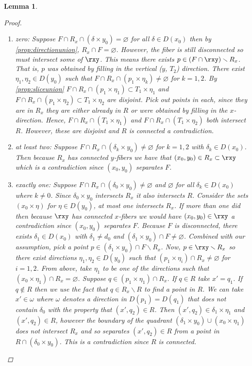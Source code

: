 \documentclass[12pt,parskip=full]{report}
\theoremstyle{plain}
\newtheorem{lem}[thm]{Lemma}
\theoremstyle{definition}
\begin{document}
\begin{lem}
\begin{proof}
        \begin{enumerate}
            \item zero: Suppose \(F\cap R_x \cap (\delta \times y_0)=\varnothing\) for all \(\delta\in D(x_0)\) then by \ref{prop:directionunion}, $R_x \cap F=\varnothing$. However, the fiber is still disconnected so must intersect some of $\rxy$. This means there exists $p\in (F\cap \rxy)\smallsetminus R_x$. That is, $p$ was obtained by filling in the vertical ($y$, $T_2$) direction. There exist $\eta_1, \eta_2\in D(y_0)$ such that $F\cap R_x \cap (p_1 \times \eta_k) \neq \varnothing$ for $k=1,2$. By \ref{prop:sliceunion} \(F\cap R_x \cap (p_1 \times \eta_1)\subset T_1\times \eta_1\) and \(F \cap R_x \cap (p_1 \times \eta_2)\subset T_1\times \eta_2\) are disjoint. Pick out points in each, since they are in $R_x$ they are either already in $R$ or were obtained by filling in the $x$-direction. Hence, $F\cap R_x \cap (T_1\times \eta_1)$ and $F\cap R_x \cap (T_1\times \eta_2)$ both intersect $R$. However, these are disjoint and $R$ is connected a contradiction.
            \item at least two: Suppose \(F\cap R_x\cap(\delta_k \times y_0)\neq\varnothing\) for $k=1,2$ with $\delta_k\in D(x_0)$. Then because $R_x$ has connected $y$-fibers we have that $(x_0,y_0)\in R_x\subset \rxy$ which is a contradiction since $(x_0,y_0)$ separates $F$.
            \item exactly one: Suppose \(F\cap R_x\cap(\delta_0 \times y_0)\neq\varnothing\) and $\varnothing$ for all $\delta_k\in D(x_0)$ where $k\neq 0$. Since $\delta_0\times y_0$ intersects $R_x$ it also intersects $R$. Consider the sets $(x_0\times \eta)$ for $\eta\in D(y_0)$, at most one intersects $R_x$. If more than one did then because $\rxy$ has connected $x$-fibers we would have $(x_0,y_0)\in\rxy$ a contradiction since $(x_0,y_0)$ separates $F$. Because $F$ is disconnected, there exists $\delta_1\in D(x_0)$ with $\delta_1\neq d_0$ and $(\delta_1\times y_0)\cap F\neq \varnothing$. Combined with our assumption, pick a point $p\in (\delta_1\times y_0)\cap F\smallsetminus R_x$. Now, $p\in\rxy\smallsetminus R_x$ so there exist directions $\eta_1,\eta_2\in D(y_0)$ such that $(p_1\times \eta_i)\cap R_x\neq\varnothing$ for $i=1,2$. From above, take $\eta_1$ to be one of the directions such that $(x_0\times \eta_1)\cap R_x =\varnothing$. Suppose $q\in (p_1\times \eta_1)\cap R_x$. If $q\in R$ take $x'=q_1$. If $q\not\in R$ then we use the fact that $q\in R_x\smallsetminus R$ to find a point in $R$. We can take $x'\in \omega$ where $\omega$ denotes a direction in $D(p_1)=D(q_1)$ that does not contain $\delta_0$ with the property that $(x',q_2)\in R$. Then $(x', q_2)\in \delta_1\times \eta_1$ and $(x',q_2)\in R$, however the boundary of the quadrant $(\delta_1\times y_0)\cup (x_0\times \eta_1)$ does not intersect $R_x$ and so separates $(x',q_2)\in R$ from a point in $R\cap (\delta_0\times y_0)$. This is a contradiction since $R$ is connected.

\end{enumerate}
\end{proof}
\end{lem}
\end{document}
